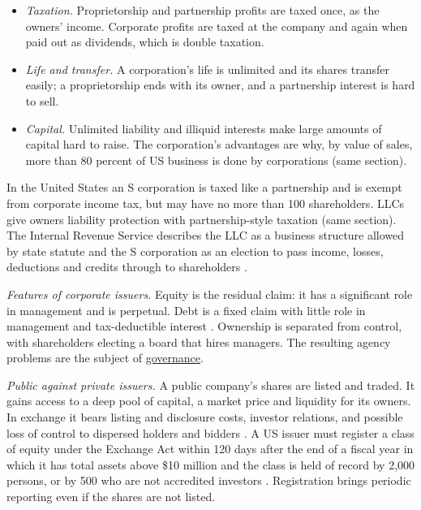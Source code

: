 \begin{qfdefinition}
\begin{itemize}
\begin{itemize}
\item A \emph{limited liability company} (LLC) gives the same form of shield to its members and managers, who may also agree to be personally obligated (sec.~18-303).
\end{itemize}
\item \emph{Taxation.} Proprietorship and partnership profits are taxed once, as the owners' income. Corporate profits are taxed at the company and again when paid out as dividends, which is double taxation.
\item \emph{Life and transfer.} A corporation's life is unlimited and its shares transfer easily; a proprietorship ends with its owner, and a partnership interest is hard to sell.
\item \emph{Capital.} Unlimited liability and illiquid interests make large amounts of capital hard to raise. The corporation's advantages are why, by value of sales, more than 80 percent of US business is done by corporations (same section).
\end{itemize}

In the United States an S corporation is taxed like a partnership and is exempt from corporate income tax, but may have no more than 100 shareholders. LLCs give owners liability protection with partnership-style taxation (same section). The Internal Revenue Service describes the LLC as a business structure allowed by state statute and the S corporation as an election to pass income, losses, deductions and credits through to shareholders \citep[``Business Structures''; ``S Corporations'']{irs-business-structures-2026}.

\emph{Features of corporate issuers.} Equity is the residual claim: it has a significant role in management and is perpetual. Debt is a fixed claim with little role in management and tax-deductible interest \citep[pp.~1--2]{applied-corporate-finance-2014}. Ownership is separated from control, with shareholders electing a board that hires managers. The resulting agency problems are the subject of \hyperref[meth:corporate-governance-evaluation]{governance}.

\emph{Public against private issuers.} A public company's shares are listed and traded. It gains access to a deep pool of capital, a market price and liquidity for its owners. In exchange it bears listing and disclosure costs, investor relations, and possible loss of control to dispersed holders and bidders \citep[p.~302]{applied-corporate-finance-2014}. A US issuer must register a class of equity under the Exchange Act within 120 days after the end of a fiscal year in which it has total assets above \$10 million and the class is held of record by 2,000 persons, or by 500 who are not accredited investors \citep[subsec.~(g)(1)(A)]{usc-15-78l}. Registration brings periodic reporting even if the shares are not listed.


\end{qfdefinition}
